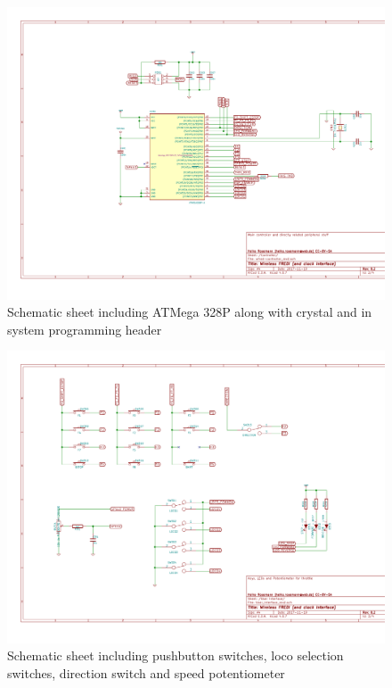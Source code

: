 \documentclass[11pt,a4paper]{scrartcl}
\begin{document}
\begin{figure}[tbh]
  \centering
  \includegraphics[width=\textwidth]{images/wfred-controller_rev2-Controller}
  \caption{Schematic sheet including ATMega 328P along with crystal and in system programming header}
  \label{schematicPage3}
\end{figure}

\begin{figure}[tbh]
  \centering
  \includegraphics[width=\textwidth]{images/User_interface_rev2-User_Interface}
  \caption{Schematic sheet including pushbutton switches, loco selection switches, direction switch and speed potentiometer}
  \label{schematicPage4}
\end{figure}
\end{document}
